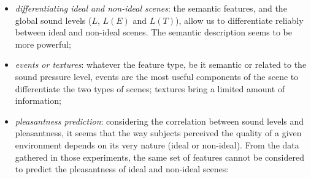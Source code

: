 \documentclass[12pt]{elsarticle}
\begin{document}
\begin{itemize}


\item \emph{differentiating ideal and non-ideal scenes}: the semantic features, and the global sound levels ($L$, $L(E)$ and $L(T)$), allow us to differentiate reliably between ideal and non-ideal scenes. The semantic description seems to be more powerful;
\item \emph{events or textures}: whatever the feature type, be it semantic or related to the sound pressure level, events are the most useful components of the scene to differentiate the two types of scenes; textures bring a limited amount of information;
\item \emph{pleasantness prediction}: considering the correlation between sound levels and pleasantness, it seems that the way subjects perceived the quality of a given environment depends on its very nature (ideal or non-ideal). From the data gathered in those experiments, the same set of features cannot be considered to predict the pleasantness of ideal and non-ideal scenes:

\begin{itemize}



\end{itemize}
\end{itemize}
\end{document}
